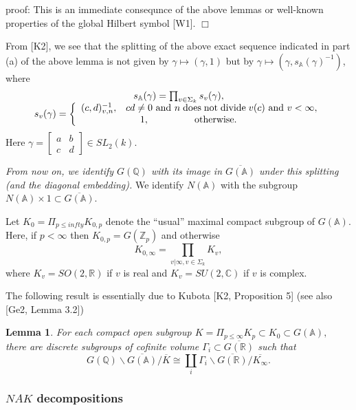 \documentclass[12pt]{article}
\newtheorem{lemma}[theorem]{Lemma}
\def\aaa{\mathbb{A}}
\def\qqq{\mathbb{Q}}
\def\ccc{\mathbb{C}}
\begin{document}
proof: This is an immediate consequnce of the above lemmas or well-known
properties of the global Hilbert symbol [W1]. $\Box $

From [K2], we see that
the splitting of the above exact sequence indicated in part (a) of the above
lemma is not given by $\gamma \longmapsto (\gamma ,1)$ but by $\gamma
\longmapsto (\gamma ,s_{\aaa }(\gamma )^{-1})$, where 
\begin{equation}
\begin{array}{c}
s_{\aaa }(\gamma )=
\prod_{v\in \Sigma _k}
s_v(\gamma),\\
s_v(\gamma)=\left\{ 
\begin{array}{c}
(c,d)_{v,n}^{-1},
\;\;\;cd\neq 0{\rm \ and\ }
n\;\mathrm{does\;not\;divide}\;v(c)
{\rm \ and\ }v<\infty, \\ 
1,\;\;\;\;\;\;\;\;\;\;\;\;\;\;\;\;
\mathrm{\;otherwise}.\;\;\;\;\;\;\;\;
\end{array}
\right.
\end{array}
\end{equation}
Here $\gamma =\left[ 
\begin{array}{cc}
a & b \\ 
c & d
\end{array}
\right] \in SL_2(k)$.

{\em From now on, we identify $G(\qqq)$ with its image
in $\overline{G(\aaa )}$ under this splitting (and the diagonal
embedding).} We identify $N(\aaa )$ with the
subgroup
$N(\aaa )\times 1\subset \overline{G(\aaa )}$.

Let $K_0=\Pi_{p\leq infty}K_{0,p}$
denote the ``usual'' maximal compact subgroup of $G(\aaa )$.
Here, if $p<\infty $ then $K_{0,p}=G({\mathbb Z}_p)$ and
otherwise
\[
K_{0,\infty}=\prod_{ v|\infty, v\in\Sigma_k}K_v, 
\]
where $K_v=SO(2,{\mathbb{R}})$ if $v$ is real and
$K_v=SU(2,\ccc )$ if $v$ is complex.

The following result is essentially due to Kubota [K2,
Proposition 5] (see also [Ge2, Lemma 3.2])

\begin{lemma}
For each compact open subgroup $K=\Pi _{p\leq \infty }K_p\subset K_0\subset
G(\aaa ),$ there are discrete subgroups of cofinite volume $\Gamma
_i\subset \overline{G({\mathbb{R}})}$ such that 
\[
G({\mathbb Q})\backslash \overline{G(\aaa )}/\overline{K}
\cong \coprod_i
\Gamma _i\backslash \overline{G({\mathbb{R}})}/\overline{K_\infty }.
\]
\end{lemma}

\subsubsection{$NAK$ decompositions}
\end{document}
